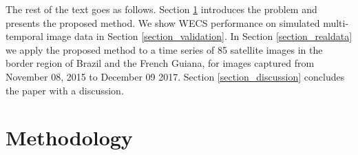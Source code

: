 \documentclass[journal]{IEEEtran}
\begin{document}

The rest of the text goes as follows. Section \ref{section_method} introduces the problem and presents the proposed method. We show WECS performance on simulated multi-temporal image data in Section \ref{section_validation}. In Section \ref{section_realdata} we apply the proposed method to a time series of 85 satellite images in the border region of Brazil and the French Guiana, for  images captured from November 08, 2015 to December 09 2017.  Section \ref{section_discussion} concludes the paper with a discussion.


\section{Methodology}\label{section_method}
\end{document}
